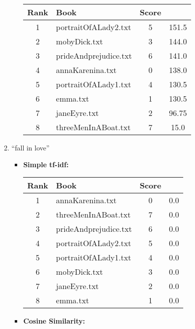 \documentclass[a4paper,11pt,oneside]{book}
\begin{document}
\begin{enumerate}
\begin{enumerate}
\begin{itemize}
										\begin{tabular}{clcc}
											\toprule
												\textbf{Rank} & \textbf{Book} & \textbf{Score}\\
											\hline
												1	&	portraitOfALady2.txt	&	5	&	151.5	\\
												2	&	mobyDick.txt	&	3	&	144.0	\\
												3	&	prideAndprejudice.txt	&	6	&	141.0	\\
												4	&	annaKarenina.txt	&	0	&	138.0	\\
												5	&	portraitOfALady1.txt	&	4	&	130.5	\\
												6	&	emma.txt	&	1	&	130.5	\\
												7	&	janeEyre.txt	&	2	&	96.75	\\
												8	&	threeMenInABoat.txt	&	7	&	15.0	\\
											\bottomrule
										\end{tabular}\newline
						\end{itemize}
						
			\item ``fall in love''
						\begin{itemize}
							\item \textbf{Simple tf-idf:}
							
										\begin{tabular}{clcc}
											\toprule
												\textbf{Rank} & \textbf{Book} & \textbf{Score}\\
											\hline
												1	&	annaKarenina.txt	&	0	&	0.0	\\
												2	&	threeMenInABoat.txt	&	7	&	0.0	\\
												3	&	prideAndprejudice.txt	&	6	&	0.0	\\
												4	&	portraitOfALady2.txt	&	5	&	0.0	\\
												5	&	portraitOfALady1.txt	&	4	&	0.0	\\
												6	&	mobyDick.txt	&	3	&	0.0	\\
												7	&	janeEyre.txt	&	2	&	0.0	\\
												8	&	emma.txt	&	1	&	0.0	\\
											\bottomrule
										\end{tabular}\newline
							\item \textbf{Cosine Similarity:}
							

\end{itemize}
\end{enumerate}
\end{enumerate}
\end{document}
